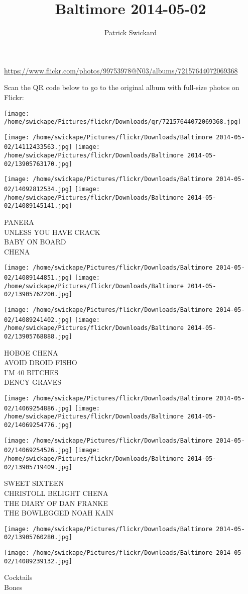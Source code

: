 \documentclass[10pt,letterpaper]{article}
\title{Baltimore 2014-05-02}
\author{Patrick Swickard}
\date{}
\begin{document}
\maketitle

\url{https://www.flickr.com/photos/99753978@N03/albums/72157644072069368}

Scan the QR code below to go to the original album with full-size photos on Flickr:

\texttt{[image: /home/swickape/Pictures/flickr/Downloads/qr/72157644072069368.jpg]}
\pagebreak

\texttt{[image: /home/swickape/Pictures/flickr/Downloads/Baltimore 2014-05-02/14112433563.jpg]}
\texttt{[image: /home/swickape/Pictures/flickr/Downloads/Baltimore 2014-05-02/13905763170.jpg]}

\texttt{[image: /home/swickape/Pictures/flickr/Downloads/Baltimore 2014-05-02/14092812534.jpg]}
\texttt{[image: /home/swickape/Pictures/flickr/Downloads/Baltimore 2014-05-02/14089145141.jpg]}

PANERA\\
UNLESS YOU HAVE CRACK\\
BABY ON BOARD\\
CHENA
\pagebreak

\texttt{[image: /home/swickape/Pictures/flickr/Downloads/Baltimore 2014-05-02/14089144851.jpg]}
\texttt{[image: /home/swickape/Pictures/flickr/Downloads/Baltimore 2014-05-02/13905762200.jpg]}

\texttt{[image: /home/swickape/Pictures/flickr/Downloads/Baltimore 2014-05-02/14089241402.jpg]}
\texttt{[image: /home/swickape/Pictures/flickr/Downloads/Baltimore 2014-05-02/13905768888.jpg]}

HOBOE CHENA\\
AVOID DROID FISHO\\
I'M 40 BITCHES\\
DENCY GRAVES
\pagebreak

\texttt{[image: /home/swickape/Pictures/flickr/Downloads/Baltimore 2014-05-02/14069254886.jpg]}
\texttt{[image: /home/swickape/Pictures/flickr/Downloads/Baltimore 2014-05-02/14069254776.jpg]}

\texttt{[image: /home/swickape/Pictures/flickr/Downloads/Baltimore 2014-05-02/14069254526.jpg]}
\texttt{[image: /home/swickape/Pictures/flickr/Downloads/Baltimore 2014-05-02/13905719409.jpg]}

SWEET SIXTEEN\\
CHRISTOLL BELIGHT CHENA\\
THE DIARY OF DAN FRANKE\\
THE BOWLEGGED NOAH KAIN
\pagebreak

\texttt{[image: /home/swickape/Pictures/flickr/Downloads/Baltimore 2014-05-02/13905760280.jpg]}

\vspace{0.25in}
\texttt{[image: /home/swickape/Pictures/flickr/Downloads/Baltimore 2014-05-02/14089239132.jpg]}

Cocktails\\
Bones
\pagebreak
\end{document}
